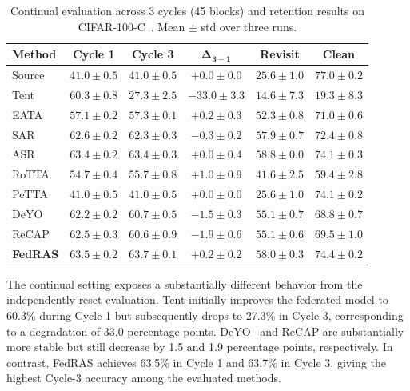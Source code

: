 \documentclass[journal]{IEEEtran}
\begin{document}
\begin{table}[t]
\centering
\caption{Continual evaluation across 3 cycles (45 blocks) and retention results on CIFAR-100-C~\cite{3}. Mean $\pm$ std over three runs.}
\label{tab:continual}
\begin{tabular}{lccccc}
\toprule
\textbf{Method} & \textbf{Cycle 1} & \textbf{Cycle 3} & $\bm{\Delta_{3-1}}$ & \textbf{Revisit} & \textbf{Clean} \\
\midrule
Source & $41.0 \pm 0.5$ & $41.0 \pm 0.5$ & $+0.0 \pm 0.0$ & $25.6 \pm 1.0$ & $\mathbf{77.0 \pm 0.2}$ \\
Tent   & $60.3 \pm 0.8$ & $27.3 \pm 2.5$ & $-33.0 \pm 3.3$ & $14.6 \pm 7.3$ & $19.3 \pm 8.3$ \\
EATA   & $57.1 \pm 0.2$ & $57.3 \pm 0.1$ & $+0.2 \pm 0.3$ & $52.3 \pm 0.8$ & $71.0 \pm 0.6$ \\
SAR    & $62.6 \pm 0.2$ & $62.3 \pm 0.3$ & $-0.3 \pm 0.2$ & $57.9 \pm 0.7$ & $72.4 \pm 0.8$ \\
ASR    & $63.4 \pm 0.2$ & $63.4 \pm 0.3$ & $+0.0 \pm 0.4$ & $\mathbf{58.8 \pm 0.0}$ & $74.1 \pm 0.3$ \\
RoTTA  & $54.7 \pm 0.4$ & $55.7 \pm 0.8$ & $+1.0 \pm 0.9$ & $41.6 \pm 2.5$ & $59.4 \pm 2.8$ \\
PeTTA  & $41.0 \pm 0.5$ & $41.0 \pm 0.5$ & $+0.0 \pm 0.0$ & $25.6 \pm 1.0$ & $74.1 \pm 0.2$ \\
DeYO   & $62.2 \pm 0.2$ & $60.7 \pm 0.5$ & $-1.5 \pm 0.3$ & $55.1 \pm 0.7$ & $68.8 \pm 0.7$ \\
ReCAP  & $62.5 \pm 0.3$ & $60.6 \pm 0.9$ & $-1.9 \pm 0.6$ & $55.1 \pm 0.6$ & $69.5 \pm 1.0$ \\
\textbf{FedRAS} & $\mathbf{63.5 \pm 0.2}$ & $\mathbf{63.7 \pm 0.1}$ & $+0.2 \pm 0.2$ & $58.0 \pm 0.3$ & $\mathbf{74.4 \pm 0.2}$ \\
\bottomrule
\end{tabular}
\end{table}

The continual setting exposes a substantially different behavior from the independently reset evaluation. Tent initially improves the federated model to 60.3\% during Cycle 1 but subsequently drops to 27.3\% in Cycle 3, corresponding to a degradation of 33.0 percentage points. DeYO~\cite{9} and ReCAP are substantially more stable but still decrease by 1.5 and 1.9 percentage points, respectively. In contrast, FedRAS achieves 63.5\% in Cycle 1 and 63.7\% in Cycle 3, giving the highest Cycle-3 accuracy among the evaluated methods.
\end{document}
